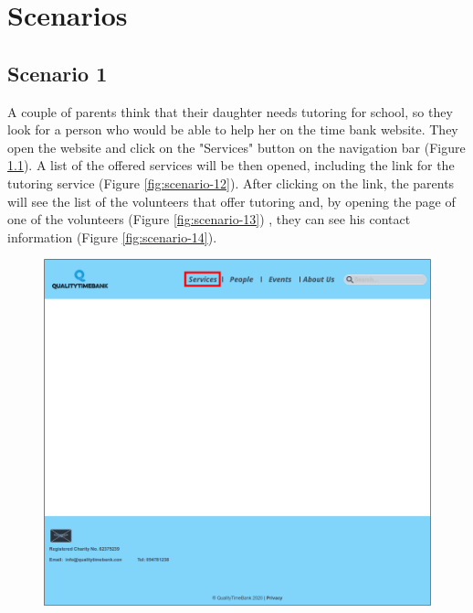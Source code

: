 \documentclass[a4paper, 11pt, parskip=half, headsepline]{scrreprt}
\begin{document}
\chapter{Scenarios}

\section{Scenario 1}

A couple of parents think that their daughter needs tutoring for school, so they look for a person who would be able to help her on the time bank website. They open the website and click on the "Services" button on the navigation bar (Figure \ref{fig:scenario-11}). A list of the offered services will be then opened, including the link for the tutoring service (Figure \ref{fig:scenario-12}). After clicking on the link, the parents will see the list of the volunteers that offer tutoring and, by opening the page of one of the volunteers (Figure \ref{fig:scenario-13}) , they can see his contact information (Figure \ref{fig:scenario-14}).

\begin{figure}[H]
	\centering
	\includegraphics[width=1\linewidth, keepaspectratio]{scenarios/scenario-11}
	\caption{}
	\label{fig:scenario-11}
\end{figure}
\end{document}
